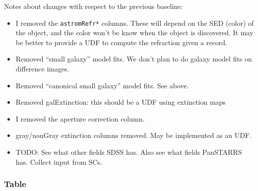 \documentclass[SE,lsstdraft,toc]{lsstdoc}
\begin{document}
\begin{changelog}
Notes about changes with respect to the previous baseline:
\begin{itemize}
    \item I removed the \texttt{astromRefr*} columns. These will depend on the SED (color) of the object, and the color won't be know when the object is discovered. It may be better to provide a UDF to compute the refraction given a \DIAObject record.
    \item Removed ``small galaxy'' model fits. We don't plan to do galaxy model fits on difference images.
    \item Removed ``canonical small galaxy'' model fits. See above.
    \item Removed galExtinction: this should be a UDF using extinction maps
    \item I removed the aperture correction column.
    \item gray/nonGray extinction columns removed. May be implemented as an UDF.
    \item TODO: See what other fields SDSS has. Also see what fields PanSTARRS has. Collect input from SCs.
\end{itemize}
\end{changelog}

\subsubsection{\DIAObject Table}

\end{document}
